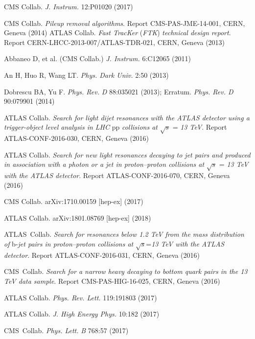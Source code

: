 \documentclass{ar-1col}
\begin{document}
\begin{thebibliography}{175}
CMS Collab. \textit{J. Instrum.} 12:P01020 (2017)

CMS Collab. \textit{Pileup removal algorithms}. Report CMS-PAS-JME-14-001, CERN, Geneva (2014)
%
ATLAS Collab. \textit{Fast TracKer} (\textit{FTK}) \textit{technical design report}. Report CERN-LHCC-2013-007/ATLAS-TDR-021, CERN, Geneva
(2013)

{Abbaneo D, et al. (CMS Collab}.) \textit{J. Instrum.} 6:C12065 (2011)

An H, Huo R, Wang LT. \textit{Phys. Dark Univ.} 2:50 (2013)

Dobrescu BA, Yu F. \textit{Phys. Rev.} \textit{D} 88:035021 (2013); Erratum. \textit{Phys. Rev. D} 90:079901 (2014)

{ATLAS Collab}. \textit{Search for light dijet resonances with the ATLAS detector using a
trigger-object level analysis in LHC }pp \textit{collisions at} $\sqrt{s}$ = \textit{13 TeV}. Report ATLAS-CONF-2016-030, CERN, Geneva (2016)

{ATLAS Collab}. \textit{Search for new light resonances decaying to jet pairs and produced in association with a photon or a jet in proton--proton collisions at}
$\sqrt{s}$ = \textit{13 TeV with the ATLAS detector}. Report ATLAS-CONF-2016-070, CERN, Geneva (2016)

{CMS Collab}. arXiv:1710.00159 [hep-ex] (2017)

{ATLAS Collab}. arXiv:1801.08769 [hep-ex] (2018)

{ATLAS~Collab}. \textit{Search for resonances below 1.2 TeV from the mass distribution of }b-\textit{jet pairs in proton--proton collisions at} $\sqrt{s}$=\textit{13 TeV with the ATLAS detector}. Report ATLAS-CONF-2016-031, CERN, Geneva (2016)

{CMS~Collab}. \textit{Search for a narrow heavy decaying to bottom quark pairs in the 13 TeV data sample}.
Report {CMS-PAS-HIG-16-025}, CERN, Geneva (2016)

{ATLAS Collab}. \textit{Phys. Rev. Lett.} 119:191803 (2017)

{ATLAS Collab}. \textit{J. High Energy Phys.} 10:182 (2017)

{CMS~Collab}. \textit{Phys. Lett.} \textit{B} 768:57 (2017)


\end{thebibliography}
\end{document}
